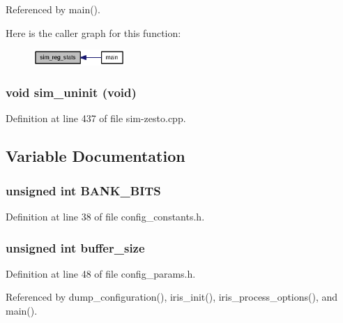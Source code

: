 Referenced by main().

Here is the caller graph for this function:\nopagebreak
\begin{figure}[H]
\begin{center}
\leavevmode
\includegraphics[width=98pt]{sim_8h_e59ed09fba74951f34eea93edae2e721_icgraph}
\end{center}
\end{figure}
\subsubsection[{sim\_\-uninit}]{\setlength{\rightskip}{0pt plus 5cm}void sim\_\-uninit (void)}\label{sim_8h_12f418d794abd0896d834c9582373b00}




Definition at line 437 of file sim-zesto.cpp.

\subsection{Variable Documentation}
\subsubsection[{BANK\_\-BITS}]{\setlength{\rightskip}{0pt plus 5cm}unsigned int {\bf BANK\_\-BITS}}\label{sim_8h_4dead09fbe9da04753765df2d1dc54dd}




Definition at line 38 of file config\_\-constants.h.
\subsubsection[{buffer\_\-size}]{\setlength{\rightskip}{0pt plus 5cm}unsigned int {\bf buffer\_\-size}}\label{sim_8h_2a0484a5686f3c473e720462aba197bb}




Definition at line 48 of file config\_\-params.h.

Referenced by dump\_\-configuration(), iris\_\-init(), iris\_\-process\_\-options(), and main().

